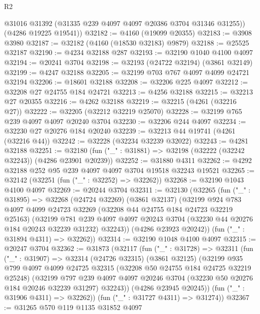 \begin{lexlean}{R2}
\begin{coremodule}
        @31016
        @31392
        (@31335 @239 @4097 @4097 @20386 @3704 @31346 @31255))
      (@4286 @19225 @19541))
@32182 := @4160 (@19099 @20355)
@32183 := @3908 @3980
@32187 := @32182 (@4160 (@18530 @32183) @9879)
@32188 := @25525 @32187
@32190 := @4234 @32188 @287
@32193 := @32190 @1040 @4100 @4097
@32194 := @20241 @3704
@32198 := @32193 (@24722 @32194) (@3861 @32149)
@32199 := @4247 @32188
@32205 := @32199 @703 @767 @4097 @4099 @24721 @32194
@32206 := @18601 @32188
@32208 := @32206 @225 @4097
@32212 := @32208 @27 @24755 @184 @24721
@32213 := @4256 @32188
@32215 := @32213 @27 @20355
@32216 := @4262 @32188
@32219 := @32215 (@4261 (@32216 @27))
@32222 := @32205 (@32212 @32219 @25070)
@32228 := @32199 @765 @239 @4097 @4097 @20240 @3704
@32230 := @32206 @244 @4097
@32234 := @32230 @27 @20276 @184 @20240
@32239 := @32213 @44 @19741 (@4261 (@32216 @44))
@32242 := @32228 (@32234 @32239 @32022)
@32243 := @4281 @32188
@32251 := @32180 (fun ("_" : @31881) => @32198 (@32222 (@32242 @32243)) (@4286 @23901 @20239))
@32252 := @31880 @4311
@32262 := @4292 @32188 @252 @95 @239 @4097 @4097 @3704 @19518 @32243 @19521
@32265 := @32142 (@32251 (fun ("_" : @32252) => @32262))
@32268 := @32190 @1043 @4100 @4097
@32269 := @20244 @3704
@32311 := @32130
    (@32265
      (fun ("_" : @31895) =>
      @32268
        (@24724 @32269)
        (@3861 @32137)
        (@32199
          @924
          @783
          @4097
          @4099
          @24723
          @32269
          (@32208 @44 @24755 @184 @24723 @32219 @25163)
          (@32199
            @781
            @239
            @4097
            @4097
            @20243
            @3704
            (@32230 @44 @20276 @184 @20243 @32239 @31232)
            @32243))
        (@4286 @23923 @20242))
      (fun ("_" : @31894 @4311) => @32262))
@32314 := @32190 @1048 @4100 @4097
@32315 := @20247 @3704
@32362 := @31873
    (@32117
      (fun ("_" : @31728) =>
      @32311
        (fun ("_" : @31907) =>
        @32314
          (@24726 @32315)
          (@3861 @32125)
          (@32199
            @935
            @799
            @4097
            @4099
            @24725
            @32315
            (@32208 @50 @24755 @184 @24725 @32219 @25248)
            (@32199
              @797
              @239
              @4097
              @4097
              @20246
              @3704
              (@32230 @50 @20276 @184 @20246 @32239 @31297)
              @32243))
          (@4286 @23945 @20245))
        (fun ("_" : @31906 @4311) => @32262))
      (fun ("_" : @31727 @4311) => @31274))
@32367 := @31265 @570 @119 @1135 @31852 @4097

\end{coremodule}
\end{lexlean}
